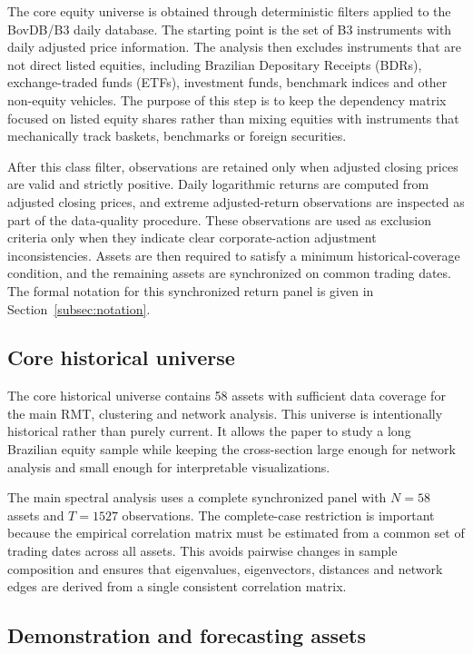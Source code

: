 The core equity universe is obtained through deterministic filters applied to the BovDB/B3 daily database. The starting point is the set of B3 instruments with daily adjusted price information. The analysis then excludes instruments that are not direct listed equities, including Brazilian Depositary Receipts (BDRs), exchange-traded funds (ETFs), investment funds, benchmark indices and other non-equity vehicles. The purpose of this step is to keep the dependency matrix focused on listed equity shares rather than mixing equities with instruments that mechanically track baskets, benchmarks or foreign securities.

After this class filter, observations are retained only when adjusted closing prices are valid and strictly positive. Daily logarithmic returns are computed from adjusted closing prices, and extreme adjusted-return observations are inspected as part of the data-quality procedure. These observations are used as exclusion criteria only when they indicate clear corporate-action adjustment inconsistencies. Assets are then required to satisfy a minimum historical-coverage condition, and the remaining assets are synchronized on common trading dates. The formal notation for this synchronized return panel is given in Section~\ref{subsec:notation}.

\subsection{Core historical universe}

The core historical universe contains 58 assets with sufficient data coverage for the main RMT, clustering and network analysis. This universe is intentionally historical rather than purely current. It allows the paper to study a long Brazilian equity sample while keeping the cross-section large enough for network analysis and small enough for interpretable visualizations.

The main spectral analysis uses a complete synchronized panel with $N=58$ assets and $T=1527$ observations. The complete-case restriction is important because the empirical correlation matrix must be estimated from a common set of trading dates across all assets. This avoids pairwise changes in sample composition and ensures that eigenvalues, eigenvectors, distances and network edges are derived from a single consistent correlation matrix.

\subsection{Demonstration and forecasting assets}

